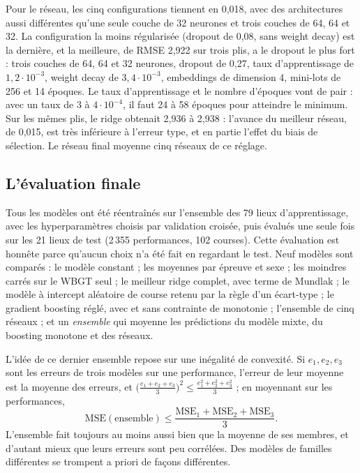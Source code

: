 \documentclass[11pt,a4paper]{article}
\begin{document}
Pour le réseau, les cinq configurations tiennent en 0,018, avec des architectures aussi différentes qu'une seule
couche de 32 neurones et trois couches de 64, 64 et 32. La configuration la moins régularisée (dropout de 0,08, sans
weight decay) est la dernière, et la meilleure, de RMSE 2,922 sur trois plis, a le dropout le plus fort : trois
couches de 64, 64 et 32 neurones, dropout de 0,27, taux d'apprentissage de $1{,}2\cdot10^{-3}$, weight decay de
$3{,}4\cdot10^{-3}$, embeddings de dimension 4, mini-lots de 256 et 14 époques. Le taux d'apprentissage et le nombre
d'époques vont de pair : avec un taux de $3$ à $4\cdot10^{-4}$, il faut 24 à 58 époques pour atteindre le minimum.
Sur les mêmes plis, le ridge obtenait 2,936 à 2,938 : l'avance du meilleur réseau, de 0,015, est très inférieure à
l'erreur type, et en partie l'effet du biais de sélection. Le réseau final moyenne cinq réseaux de ce réglage.

\subsection{L'évaluation finale}\label{sec:test}

Tous les modèles ont été réentraînés sur l'ensemble des 79 lieux d'apprentissage, avec les hyperparamètres choisis
par validation croisée, puis évalués une seule fois sur les 21 lieux de test (2\,355 performances, 102 courses).
Cette évaluation est honnête parce qu'aucun choix n'a été fait en regardant le test. Neuf modèles sont comparés : le
modèle constant ; les moyennes par épreuve et sexe ; les moindres carrés sur le WBGT seul ; le meilleur ridge complet,
avec terme de Mundlak ; le modèle à intercept aléatoire de course retenu par la règle d'un écart-type ; le gradient
boosting réglé, avec et sans contrainte de monotonie ; l'ensemble de cinq réseaux ; et un \emph{ensemble} qui moyenne
les prédictions du modèle mixte, du boosting monotone et des réseaux.

L'idée de ce dernier ensemble repose sur une inégalité de convexité. Si $e_1, e_2, e_3$ sont les erreurs de trois
modèles sur une performance, l'erreur de leur moyenne est la moyenne des erreurs, et
$\big(\frac{e_1 + e_2 + e_3}{3}\big)^2 \leq \frac{e_1^2 + e_2^2 + e_3^2}{3}$ ; en moyennant sur les performances,
\[
\mathrm{MSE}(\text{ensemble}) \leq \frac{\mathrm{MSE}_1 + \mathrm{MSE}_2 + \mathrm{MSE}_3}{3} .
\]
L'ensemble fait toujours au moins aussi bien que la moyenne de ses membres, et d'autant mieux que leurs erreurs sont
peu corrélées. Des modèles de familles différentes se trompent a priori de façons différentes.
\end{document}
